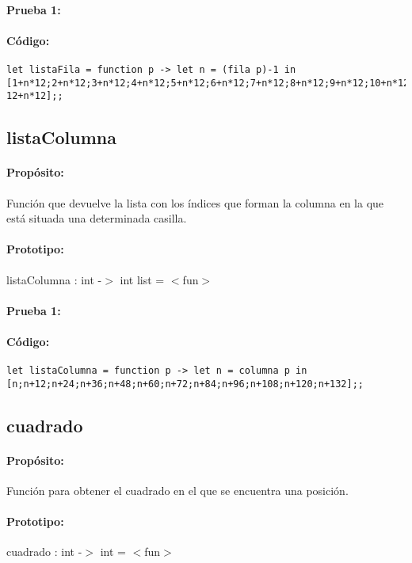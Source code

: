 \paragraph{Prueba 1:}
\paragraph{Código:}
\begin{verbatim}
let listaFila = function p -> let n = (fila p)-1 in
[1+n*12;2+n*12;3+n*12;4+n*12;5+n*12;6+n*12;7+n*12;8+n*12;9+n*12;10+n*12;11+n*12;
12+n*12];;
\end{verbatim}

\subsection{listaColumna}

\paragraph{Propósito:} Función que devuelve la lista con los índices que forman la columna
en la que está situada una determinada casilla.
\paragraph{Prototipo:} listaColumna : int -$>$ int list = $<$fun$>$
\paragraph{Prueba 1:}
\paragraph{Código:}
\begin{verbatim}
let listaColumna = function p -> let n = columna p in
[n;n+12;n+24;n+36;n+48;n+60;n+72;n+84;n+96;n+108;n+120;n+132];;
\end{verbatim}

\subsection{cuadrado}

\paragraph{Propósito:} Función para obtener el cuadrado en el que se encuentra una posición.
\paragraph{Prototipo:} cuadrado : int -$>$ int = $<$fun$>$
